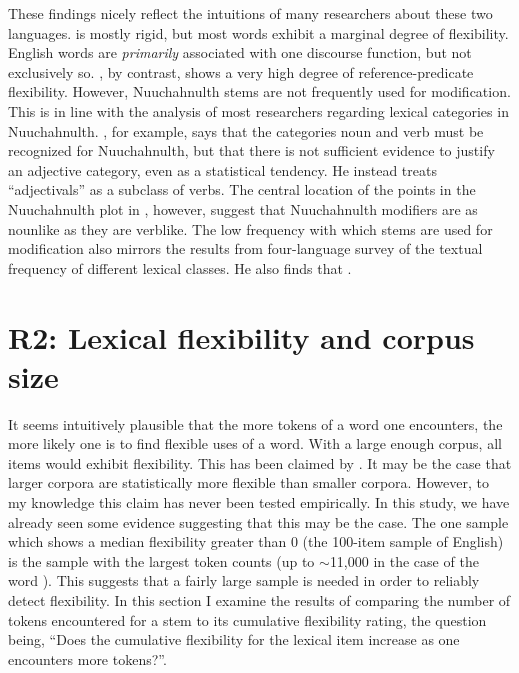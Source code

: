 These findings nicely reflect the intuitions of many researchers about these two languages.  is mostly rigid, but most words exhibit a marginal degree of flexibility. English words are \emph{primarily} associated with one discourse function, but not exclusively so. , by contrast, shows a very high degree of reference-predicate flexibility. However, Nuuchahnulth stems are not frequently used for modification. This is in line with the analysis of most researchers regarding lexical categories in Nuuchahnulth. \textcite[50]{Nakayama2001}, for example, says that the categories noun and verb must be recognized for Nuuchahnulth, but that there is not sufficient evidence to justify an adjective category, even as a statistical tendency. He instead treats \enquote{adjectivals} as a subclass of verbs. The central location of the points in the Nuuchahnulth plot in , however, suggest that Nuuchahnulth modifiers are as nounlike as they are verblike. The low frequency with which stems are used for modification also mirrors the results from  four-language survey of the textual frequency of different lexical classes. He also finds that .

\section{R2: Lexical flexibility and corpus size}
\label{sec:4.4}

It seems intuitively plausible that the more tokens of a word one encounters, the more likely one is to find flexible uses of a word. With a large enough corpus, all items would exhibit flexibility. This has been claimed by \textcite[77]{MoselHovdhaugen1992}. It may be the case that larger corpora are statistically more flexible than smaller corpora. However, to my knowledge this claim has never been tested empirically. In this study, we have already seen some evidence suggesting that this may be the case. The one sample which shows a median flexibility greater than $0$ (the 100-item sample of English) is the sample with the largest token counts (up to $\sim$11,000 in the case of the word ). This suggests that a fairly large sample is needed in order to reliably detect flexibility. In this section I examine the results of comparing the number of tokens encountered for a stem to its cumulative flexibility rating, the question being, \enquote{Does the cumulative flexibility for the lexical item increase as one encounters more tokens?}.

